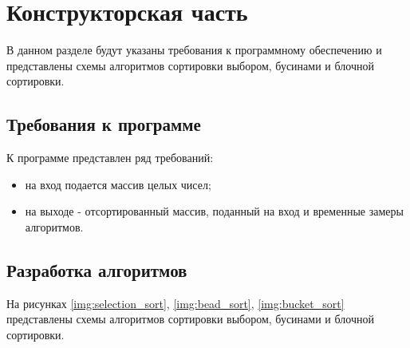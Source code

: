 \chapter{Конструкторская часть}

В данном разделе будут указаны требования к программному обеспечению и представлены схемы алгоритмов сортировки выбором, бусинами и блочной сортировки.

\section{Требования к программе}

К программе представлен ряд требований:

\begin{itemize}
	\item на вход подается массив целых чисел;
	\item на выходе - отсортированный массив, поданный на вход и временные замеры алгоритмов.
\end{itemize}

\section{Разработка алгоритмов}

На рисунках \ref{img:selection_sort}, \ref{img:bead_sort}, \ref{img:bucket_sort} представлены схемы алгоритмов сортировки выбором, бусинами и блочной сортировки.

